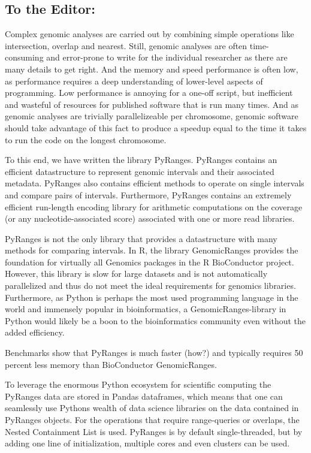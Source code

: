 \documentclass[10pt,letterpaper]{article}
\begin{document}
\subsection*{To the Editor:} Complex genomic analyses are carried out by
combining simple operations like intersection, overlap and nearest. Still,
genomic analyses are often time-consuming and error-prone to write for the
individual researcher as there are many details to get right. And the memory and
speed performance is often low, as performance requires a deep understanding of
lower-level aspects of programming. Low performance is annoying for a one-off
script, but inefficient and wasteful of resources for published software that is
run many times. And as genomic analyses are trivially parallelizeable per
chromosome, genomic software should take advantage of this fact to produce a
speedup equal to the time it takes to run the code on the longest chromosome.

To this end, we have written the library PyRanges. PyRanges contains an
efficient datastructure to represent genomic intervals and their associated
metadata. PyRanges also contains efficient methods to operate on single
intervals and compare pairs of intervals. Furthermore, PyRanges contains an
extremely efficient run-length encoding library for arithmetic computations on
the coverage (or any nucleotide-associated score) associated with one or more
read libraries.

PyRanges is not the only library that provides a datastructure with many methods
for comparing intervals. In R, the library GenomicRanges
\cite{10.1371/journal.pcbi.1003118} provides the foundation for virtually all
Genomics packages in the R BioConductor \cite{Gentleman2004} project. However,
this library is slow for large datasets and is not automatically parallelized
and thus do not meet the ideal requirements for genomics libraries. Furthermore,
as Python is perhaps the most used programming language in the world and
immensely popular in bioinformatics, a GenomicRanges-library in Python would
likely be a boon to the bioinformatics community even without the added
efficiency.

Benchmarks show that PyRanges is much faster (how?) and typically requires 50
percent less memory than BioConductor GenomicRanges.

To leverage the enormous Python ecosystem for scientific computing the PyRanges
data are stored in Pandas dataframes, which means that one can seamlessly use
Pythons wealth of data science libraries on the data contained in PyRanges
objects. For the operations that require range-queries or overlaps, the Nested
Containment List \cite{doi:10.1093/bioinformatics/btl647} is used. PyRanges is
by default single-threaded, but by adding one line of initialization, multiple
cores and even clusters can be used.
\end{document}
